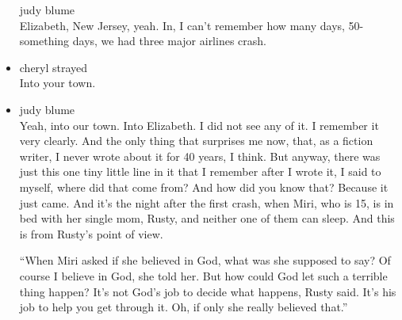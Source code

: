 \begin{itemize}
  judy blume\\
  Elizabeth, New Jersey, yeah. In, I can't remember how many days,
  50-something days, we had three major airlines crash.
\item
  cheryl strayed\\
  Into your town.
\item
  judy blume\\
  Yeah, into our town. Into Elizabeth. I did not see any of it. I
  remember it very clearly. And the only thing that surprises me now,
  that, as a fiction writer, I never wrote about it for 40 years, I
  think. But anyway, there was just this one tiny little line in it that
  I remember after I wrote it, I said to myself, where did that come
  from? And how did you know that? Because it just came. And it's the
  night after the first crash, when Miri, who is 15, is in bed with her
  single mom, Rusty, and neither one of them can sleep. And this is from
  Rusty's point of view.

  ``When Miri asked if she believed in God, what was she supposed to
  say? Of course I believe in God, she told her. But how could God let
  such a terrible thing happen? It's not God's job to decide what
  happens, Rusty said. It's his job to help you get through it. Oh, if
  only she really believed that.''


\end{itemize}
